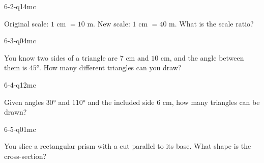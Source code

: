 \begin{practiceQuestion}{6-2-q14}{mc}
\begin{questionText}
Original scale: $1$ cm $= 10$ m. New scale: $1$ cm $= 40$ m. What is the scale ratio?
\end{questionText}
\end{practiceQuestion}

\begin{practiceQuestion}{6-3-q04}{mc}
\begin{questionText}
You know two sides of a triangle are $7$ cm and $10$ cm, and the angle between them is $45°$. How many different triangles can you draw?
\end{questionText}
\end{practiceQuestion}

\begin{practiceQuestion}{6-4-q12}{mc}
\begin{questionText}
Given angles $30°$ and $110°$ and the included side $6$ cm, how many triangles can be drawn?
\end{questionText}
\end{practiceQuestion}

\begin{practiceQuestion}{6-5-q01}{mc}
\begin{questionText}
You slice a rectangular prism with a cut parallel to its base. What shape is the cross-section?
\end{questionText}
\end{practiceQuestion}

